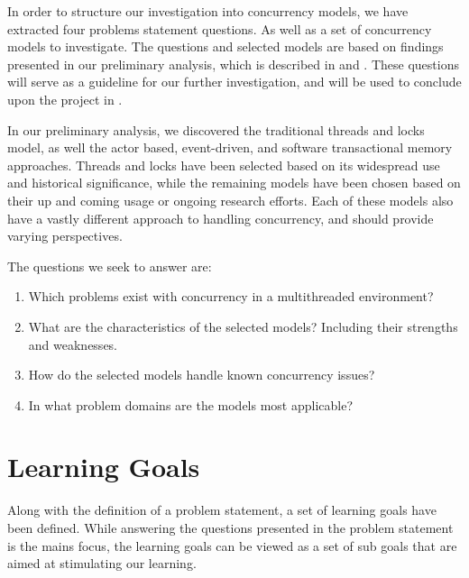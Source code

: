 \makeatletter {}\makeatother
{}
%
In order to structure our investigation into concurrency models, we have extracted four problems statement questions. As well as a set of concurrency models to investigate. The questions and selected models are based on findings presented in our preliminary analysis, which is described in  and . These questions will serve as a guideline for our further investigation, and will be used to conclude upon the project in .

In our preliminary analysis, we discovered the traditional threads and locks model, as well the actor based, event-driven, and software transactional memory approaches. Threads and locks have been selected based on its widespread use and historical significance, while the remaining models have been chosen based on their up and coming usage or ongoing research efforts. Each of these models also have a vastly different approach to handling concurrency, and should provide varying perspectives.

The questions we seek to answer are:
\begin{enumerate}
\item Which problems exist with concurrency in a multithreaded environment? 
\item What are the characteristics of the selected models? Including their strengths and weaknesses.
\item How do the selected models handle known concurrency issues?
\item In what problem domains are the models most applicable?
\end{enumerate}


\section{Learning Goals}
Along with the definition of a problem statement, a set of learning goals have been defined. While answering the questions presented in the problem statement is the mains focus, the learning goals can be viewed as a set of sub goals that are aimed at stimulating our learning.

